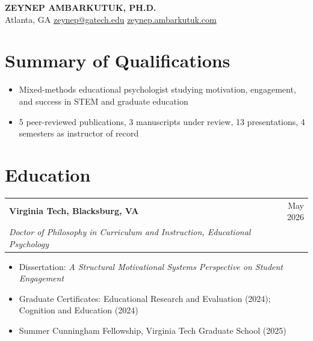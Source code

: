 \documentclass[letterpaper,11pt]{article}
\makeatletter
\newcommand{\entry}[4]{%
  \begin{tabular*}{\linewidth}[t]{@{}l@{\extracolsep{\fill}}r@{}}
    \textbf{#1} & #2 \\
    \textit{#3} & \textit{#4} \\
  \end{tabular*}\par\vspace{1pt}}
\newenvironment{bullets}%
  {\begin{itemize}[leftmargin=1.2em, itemsep=0pt, parsep=0pt, topsep=1pt, label=\textbullet]}%
  {\end{itemize}\vspace{2pt}}
\makeatother
\begin{document}
\thispagestyle{firstpage}

\begin{center}
  {\fontsize{22}{26}\selectfont\bfseries ZEYNEP AMBARKUTUK, PH.D.}\\[4pt]
  Atlanta, GA
  \enspace\textbar\enspace \href{mailto:zeynep@gatech.edu}{zeynep@gatech.edu}%
  \enspace\textbar\enspace \href{https://zeynep.ambarkutuk.com}{zeynep.ambarkutuk.com}%
\end{center}
\vspace{-6pt}

\section{Summary of Qualifications}
\begin{bullets}
  \item Mixed-methods educational psychologist studying motivation, engagement, and success in STEM and graduate education
  \item 5 peer-reviewed publications, 3 manuscripts under review, 13 presentations, 4 semesters as instructor of record
\end{bullets}

\section{Education}
\entry{Virginia Tech, Blacksburg, VA}{May 2026}
      {Doctor of Philosophy in Curriculum and Instruction, Educational Psychology}{}
\begin{bullets}
  \item Dissertation: \textit{A Structural Motivational Systems Perspective on Student Engagement}
  \item Graduate Certificates: Educational Research and Evaluation (2024); Cognition and Education (2024)
  \item Summer Cunningham Fellowship, Virginia Tech Graduate School (2025)
\end{bullets}
\end{document}
